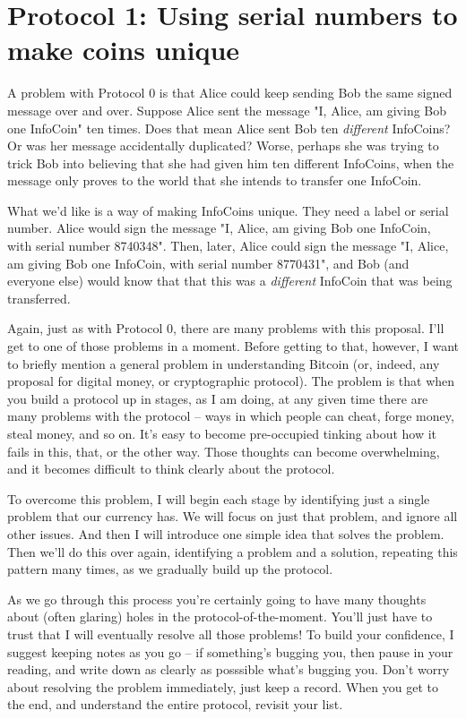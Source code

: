 \documentclass[12pt]{book}
\newcounter{problem}[chapter]
\begin{document}
\section{Protocol 1: Using serial numbers to make coins unique}

A problem with Protocol 0 is that Alice could keep sending Bob the
same signed message over and over.  Suppose Alice sent the message "I,
Alice, am giving Bob one InfoCoin" ten times.  Does that mean Alice
sent Bob ten \emph{different} InfoCoins?  Or was her message
accidentally duplicated?  Worse, perhaps she was trying to trick Bob
into believing that she had given him ten different InfoCoins, when
the message only proves to the world that she intends to transfer one
InfoCoin.

What we'd like is a way of making InfoCoins unique.  They need a label
or serial number.  Alice would sign the message "I, Alice, am giving
Bob one InfoCoin, with serial number 8740348".  Then, later, Alice
could sign the message "I, Alice, am giving Bob one InfoCoin, with
serial number 8770431", and Bob (and everyone else) would know that
that this was a \emph{different} InfoCoin that was being transferred.

Again, just as with Protocol 0, there are many problems with this
proposal.  I'll get to one of those problems in a moment.  Before
getting to that, however, I want to briefly mention a general problem
in understanding Bitcoin (or, indeed, any proposal for digital money,
or cryptographic protocol).  The problem is that when you build a
protocol up in stages, as I am doing, at any given time there are many
problems with the protocol -- ways in which people can cheat, forge
money, steal money, and so on.  It's easy to become pre-occupied
tinking about how it fails in this, that, or the other way.  Those
thoughts can become overwhelming, and it becomes difficult to think
clearly about the protocol.

To overcome this problem, I will begin each stage by identifying just
a single problem that our currency has.  We will focus on just that
problem, and ignore all other issues.  And then I will introduce one
simple idea that solves the problem.  Then we'll do this over again,
identifying a problem and a solution, repeating this pattern many
times, as we gradually build up the protocol.

As we go through this process you're certainly going to have many
thoughts about (often glaring) holes in the protocol-of-the-moment.
You'll just have to trust that I will eventually resolve all those
problems!  To build your confidence, I suggest keeping notes as you go
-- if something's bugging you, then pause in your reading, and write
down as clearly as posssible what's bugging you.  Don't worry about
resolving the problem immediately, just keep a record.  When you get
to the end, and understand the entire protocol, revisit your list.
\end{document}
